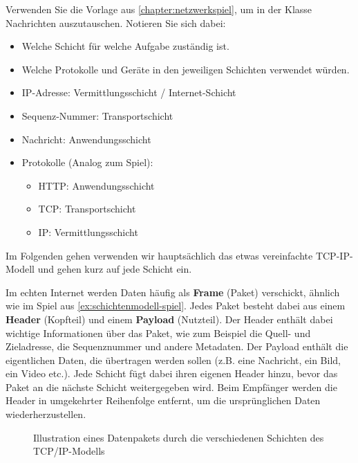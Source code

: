 \begin{myexercise}[Netzwerkspiel]\label{ex:schichtenmodell-spiel}
	Verwenden Sie die Vorlage aus \ref{chapter:netzwerkspiel}, um in der Klasse Nachrichten auszutauschen. Notieren Sie sich dabei:
	\begin{itemize}
		\item Welche Schicht für welche Aufgabe zuständig ist.
		\item Welche Protokolle und Geräte in den jeweiligen Schichten verwendet würden.
	\end{itemize}
	\begin{myanswer}
		\begin{itemize}
			\item \gls{IP}-Adresse: Vermittlungsschicht / Internet-Schicht
			\item Sequenz-Nummer: Transportschicht
			\item Nachricht: Anwendungsschicht
			\item Protokolle (Analog zum Spiel):
			      \begin{itemize}
				      \item \gls{HTTP}: Anwendungsschicht
				      \item \gls{TCP}: Transportschicht
				      \item \gls{IP}: Vermittlungsschicht
			      \end{itemize}
		\end{itemize}
	\end{myanswer}
\end{myexercise}

Im Folgenden gehen verwenden wir hauptsächlich das etwas vereinfachte \acrfull{TCP}-\acrfull{IP}-Modell und gehen kurz auf jede Schicht ein.

Im echten Internet werden Daten häufig als \textbf{Frame} (Paket) verschickt, ähnlich wie im Spiel aus \cref{ex:schichtenmodell-spiel}. Jedes Paket besteht dabei aus einem \textbf{Header} (Kopfteil) und einem \textbf{Payload} (Nutzteil). Der Header enthält dabei wichtige Informationen über das Paket, wie zum Beispiel die Quell- und Zieladresse, die Sequenznummer und andere Metadaten. Der Payload enthält die eigentlichen Daten, die übertragen werden sollen (z.B. eine Nachricht, ein Bild, ein Video etc.). Jede Schicht fügt dabei ihren eigenen Header hinzu, bevor das Paket an die nächste Schicht weitergegeben wird. Beim Empfänger werden die Header in umgekehrter Reihenfolge entfernt, um die ursprünglichen Daten wiederherzustellen.

\begin{figure}[H]
	\centering
	
	\caption{Illustration eines Datenpakets durch die verschiedenen Schichten des \gls{TCP}/\gls{IP}-Modells}
\end{figure}


